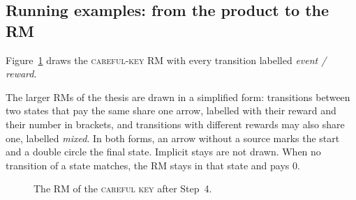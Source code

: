 \documentclass[11pt,english,listoffigures,listoftables]{tfgetsinf}
\newcommand{\runex}[1]{\textsc{#1}}  %
\begin{document}
\subsection{Running examples: from the product to the RM}
\label{sec:run-step4}
Figure~\ref{fig:ex3-rm} draws the \runex{careful-key} RM with every transition labelled \textit{event / reward}.

The larger RMs of the thesis are drawn in a simplified form: transitions between two states that pay the same share one arrow, labelled with their reward and their number in brackets, and transitions with different rewards may also share one, labelled \textit{mixed}. In both forms, an arrow without a source marks the start and a double circle the final state. Implicit stays are not drawn. When no transition of a state matches, the RM stays in that state and pays 0.

\begin{figure}[H]
\centering
{}
\caption[RM of the \runex{careful key}]{The RM of the \runex{careful key} after Step~4.}
\label{fig:ex3-rm}
\end{figure}
\end{document}
